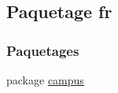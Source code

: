 \hypertarget{namespacefr}{}\subsection{Paquetage fr}
\label{namespacefr}
\subsubsection*{Paquetages}
\begin{DoxyCompactItemize}
\item 
package \hyperlink{namespacefr_1_1campus}{campus}
\end{DoxyCompactItemize}
